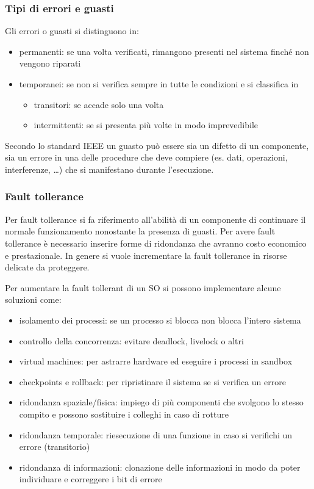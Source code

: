 \documentclass[a4paper]{article}
\begin{document}
\subsubsection*{Tipi di errori e guasti}
Gli errori o guasti si distinguono in:
\begin{itemize}
	\item permanenti: se una volta verificati, rimangono presenti nel sistema finché non vengono riparati
	\item temporanei: se non si verifica sempre in tutte le condizioni e si classifica in
	\begin{itemize}[topsep=0pt]
		\item transitori: se accade solo una volta
		\item intermittenti: se si presenta più volte in modo imprevedibile
	\end{itemize}
\end{itemize}
Secondo lo standard IEEE un guasto può essere sia un difetto di un componente, sia un errore in una delle procedure che deve
compiere (es. dati, operazioni, interferenze, \dots) che si manifestano durante l'esecuzione.

\subsubsection*{Fault tollerance}
Per fault tollerance si fa riferimento all'abilità di un componente di continuare il normale funzionamento nonostante la
presenza di guasti. Per avere fault tollerance è necessario inserire forme di ridondanza che avranno costo economico e
prestazionale. In genere si vuole incrementare la fault tollerance in risorse delicate da proteggere.

\noindent
Per aumentare la fault tollerant di un SO si possono implementare alcune soluzioni come:
\begin{itemize}
	\item isolamento dei processi: se un processo si blocca non blocca l'intero sistema
	\item controllo della concorrenza: evitare deadlock, livelock o altri
	\item virtual machines: per astrarre hardware ed eseguire i processi in sandbox
	\item checkpoints e rollback: per ripristinare il sistema se si verifica un errore
	\item ridondanza spaziale/fisica: impiego di più componenti che svolgono lo stesso compito e possono sostituire i colleghi
	in caso di rotture
	\item ridondanza temporale: riesecuzione di una funzione in caso si verifichi un errore (transitorio)
	\item ridondanza di informazioni: clonazione delle informazioni in modo da poter individuare e correggere i bit di errore
\end{itemize}
\end{document}
